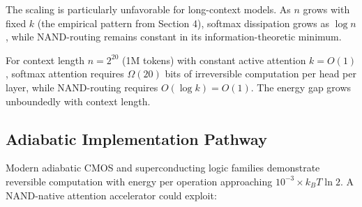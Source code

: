 The scaling is particularly unfavorable for long-context models. As $n$ grows with fixed $k$ (the empirical pattern from Section 4), softmax dissipation grows as $\log n$, while NAND-routing remains constant in its information-theoretic minimum.













\begin{corollary}






For context length $n = 2^{20}$ (1M tokens) with constant active attention $k = O(1)$, softmax attention requires $\Omega(20)$ bits of irreversible computation per head per layer, while NAND-routing requires $O(\log k) = O(1)$. The energy gap grows unboundedly with context length.






\end{corollary}













\subsection{Adiabatic Implementation Pathway}













Modern adiabatic CMOS and superconducting logic families \cite{athas1994,likarev2007} demonstrate reversible computation with energy per operation approaching $10^{-3} \times k_B T \ln 2$. A NAND-native attention accelerator could exploit:













